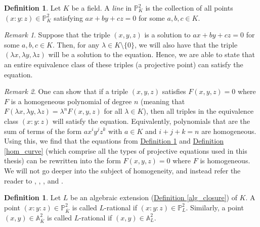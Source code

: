 \documentclass[openany, a4paper, 10pt]{book}
\theoremstyle{plain}
\theoremstyle{plain}
\theoremstyle{plain}
\theoremstyle{definition}
\newtheorem{definition}[theorem]{Definition}
\theoremstyle{plain}
\theoremstyle{definition}
\theoremstyle{remark}
\newtheorem*{remark}{Remark}
\newcommand{\defref}[1]{\hyperref[#1]{Definition \ref{#1}}}
\begin{document}
\begin{definition}\label{proj_line}
    Let $K$ be a field.
    A \textit{line} in $\mathbb P^2_K$ is the collection of all points $(x:y:z) \in \mathbb P^2_K$ satisfying
    $ax + by + cz = 0$
    for some $a,b,c \in K$.
\end{definition}
\begin{remark}
    Suppose that the triple $(x, y, z)$ is a solution to $ax+by+cz=0$ for some $a,b,c \in K$.
    Then, for any $\lambda \in K \setminus \{ 0 \}$, we will also have that the triple $(\lambda x, \lambda y, \lambda z)$ will be a solution to the equation.
    Hence, we are able to state that an entire equivalence class of these triples (a projective point) can satisfy the equation.
\end{remark}
\begin{remark}
    One can show that if a triple $(x,y,z)$ satisfies $F(x,y,z)=0$ where $F$ is a homogeneous polynomial of degree $n$ (meaning that $F(\lambda x, \lambda y, \lambda z) = \lambda^n F(x, y, z)$ for all $\lambda \in K$), then all triples in the equivalence class $(x:y:z)$ will satisfy the equation.
    Equivalently, polynomials that are the sum of terms of the form $a x^i y^j z^k$ with $a \in K$ and $i+j+k=n$ are homogeneous.
    Using this, we find that the equations from \defref{proj_line} and \defref{hom_curve} (which comprise all the types of projective equations used in this thesis) can be rewritten into the form $F(x,y,z)=0$ where $F$ is homogeneous.
    We will not go deeper into the subject of homogeneity, and instead refer the reader to
    \cite[Section~2.3]{washington}, \cite[Appendix~A.2]{silverman}, \cite[Section~I.2]{arithmetic}, and \cite[Lecture~1]{algebraic_geometry}.
\end{remark}

\begin{definition}
    Let $L$ be an algebraic extension (\defref{alg_closure}) of $K$.
    A point $(x:y:z) \in \mathbb P^2_{\overline K}$ is called $L$-rational if $(x:y:z) \in \mathbb P^2_L$.
    Similarly, a point $(x,y) \in \mathbb A^2_{\overline K}$ is called $L$-rational if $(x,y) \in \mathbb A^2_{L}$.
\end{definition}
\end{document}
